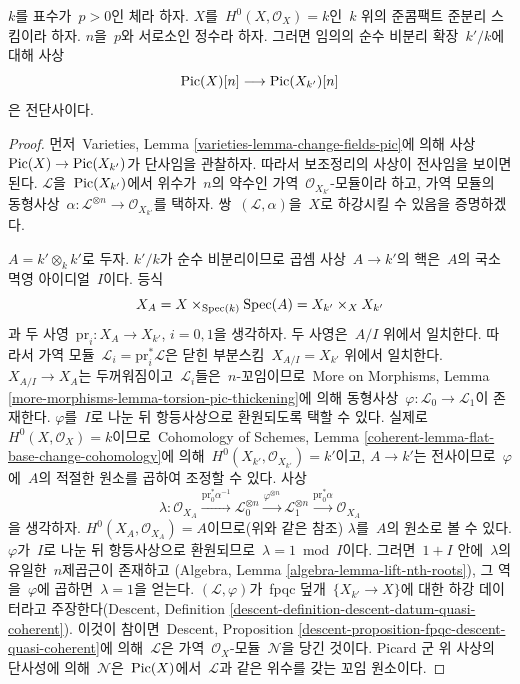 \begin{lemma}
\label{lemma-torsion-descends}
$k$를 표수가\  $p > 0$인 체라 하자. $X$를\ 
$H^0(X, \mathcal{O}_X) = k$인\  $k$ 위의 준콤팩트 준분리 스킴이라 하자.
$n$을\  $p$와 서로소인 정수라 하자. 그러면 임의의 순수 비분리 확장\ 
$k'/k$에 대해 사상
$$
\mathop{\mathrm{Pic}}\nolimits(X)[n] \longrightarrow \mathop{\mathrm{Pic}}\nolimits(X_{k'})[n]
$$
은 전단사이다.
\end{lemma}

\begin{proof}
먼저\  Varieties, Lemma \ref{varieties-lemma-change-fields-pic}에 의해 사상\ 
$\mathop{\mathrm{Pic}}\nolimits(X) \to \mathop{\mathrm{Pic}}\nolimits(X_{k'})$가 단사임을 관찰하자. 따라서 보조정리의 사상이
전사임을 보이면 된다. $\mathcal{L}$을\  $\mathop{\mathrm{Pic}}\nolimits(X_{k'})$에서 위수가\  $n$의
약수인 가역\  $\mathcal{O}_{X_{k'}}$-모듈이라 하고, 가역 모듈의 동형사상\ 
$\alpha : \mathcal{L}^{\otimes n} \to \mathcal{O}_{X_{k'}}$를 택하자.
쌍\  $(\mathcal{L}, \alpha)$을\  $X$로 하강시킬 수 있음을 증명하겠다.

\medskip\noindent
$A = k' \otimes_k k'$로 두자. $k'/k$가 순수 비분리이므로 곱셈 사상\ 
$A \to k'$의 핵은\  $A$의 국소 멱영 아이디얼\  $I$이다. 등식
$$
X_A = X \times_{\mathop{\mathrm{Spec}}(k)} \mathop{\mathrm{Spec}}(A) = X_{k'} \times_X X_{k'}
$$
과 두 사영\  $\text{pr}_i : X_A \to X_{k'}$, $i = 0, 1$을 생각하자.
두 사영은\  $A/I$ 위에서 일치한다. 따라서 가역 모듈\ 
$\mathcal{L}_i = \text{pr}_i^*\mathcal{L}$은 닫힌 부분스킴\ 
$X_{A/I} = X_{k'}$ 위에서 일치한다. $X_{A/I} \to X_A$는 두꺼워짐이고\ 
$\mathcal{L}_i$들은\  $n$-꼬임이므로\  More on Morphisms, Lemma
\ref{more-morphisms-lemma-torsion-pic-thickening}에 의해 동형사상\ 
$\varphi : \mathcal{L}_0 \to \mathcal{L}_1$이 존재한다.
$\varphi$를\  $I$로 나눈 뒤 항등사상으로 환원되도록 택할 수 있다.
실제로\  $H^0(X, \mathcal{O}_X) = k$이므로\  Cohomology of Schemes, Lemma
\ref{coherent-lemma-flat-base-change-cohomology}에 의해\ 
$H^0(X_{k'}, \mathcal{O}_{X_{k'}}) = k'$이고, $A \to k'$는 전사이므로\ 
$\varphi$에\  $A$의 적절한 원소를 곱하여 조정할 수 있다. 사상
$$
\lambda : \mathcal{O}_{X_A}
\xrightarrow{\text{pr}_0^*\alpha^{-1}}
\mathcal{L}_0^{\otimes n}
\xrightarrow{\varphi^{\otimes n}}
\mathcal{L}_1^{\otimes n}
\xrightarrow{\text{pr}_0^*\alpha}
\mathcal{O}_{X_A}
$$
을 생각하자. $H^0(X_A, \mathcal{O}_{X_A}) = A$이므로(위와 같은 참조)
$\lambda$를\  $A$의 원소로 볼 수 있다. $\varphi$가\  $I$로 나눈 뒤
항등사상으로 환원되므로\  $\lambda = 1 \bmod I$이다. 그러면\  $1 + I$ 안에\ 
$\lambda$의 유일한\  $n$제곱근이 존재하고
(Algebra, Lemma \ref{algebra-lemma-lift-nth-roots}), 그 역을\ 
$\varphi$에 곱하면\  $\lambda = 1$을 얻는다.
$(\mathcal{L}, \varphi)$가\  fpqc 덮개\  $\{X_{k'} \to X\}$에 대한 하강
데이터라고 주장한다(Descent, Definition
\ref{descent-definition-descent-datum-quasi-coherent}). 이것이 참이면\ 
Descent, Proposition \ref{descent-proposition-fpqc-descent-quasi-coherent}에
의해\  $\mathcal{L}$은 가역\  $\mathcal{O}_X$-모듈\  $\mathcal{N}$을 당긴 것이다.
Picard 군 위 사상의 단사성에 의해\  $\mathcal{N}$은\  $\mathop{\mathrm{Pic}}\nolimits(X)$에서\ 
$\mathcal{L}$과 같은 위수를 갖는 꼬임 원소이다.


\end{proof}

